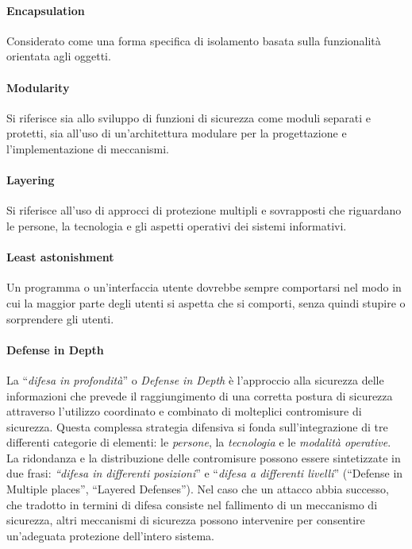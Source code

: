 \paragraph{Encapsulation}
Considerato come una forma specifica di isolamento basata sulla funzionalità
orientata agli oggetti.

\paragraph{Modularity}
Si riferisce sia allo sviluppo di funzioni di sicurezza come moduli separati e
protetti, sia all'uso di
un'architettura modulare per la progettazione e l'implementazione di meccanismi.

\paragraph{Layering}
Si riferisce all'uso di approcci di protezione multipli e sovrapposti che
riguardano le persone, la
tecnologia e gli aspetti operativi dei sistemi informativi.

\paragraph{Least astonishment}
Un programma o un'interfaccia utente dovrebbe sempre comportarsi nel modo in cui la maggior parte degli utenti si aspetta che si comporti, senza quindi stupire o sorprendere gli utenti.

\paragraph{Defense in Depth}
La ``\textit{difesa in profondità}'' o \textit{Defense in Depth} è
l'approccio alla sicurezza delle informazioni che
prevede il raggiungimento di una corretta postura di sicurezza attraverso
l'utilizzo coordinato e combinato di molteplici contromisure di sicurezza.
Questa complessa strategia difensiva si fonda sull'integrazione di tre differenti
categorie di elementi: le \textit{persone}, la \textit{tecnologia} e le
\textit{modalità operative}. La ridondanza e la distribuzione delle
contromisure possono essere sintetizzate in due
frasi: \textit{``difesa in differenti posizioni}'' e
``\textit{difesa a differenti livelli}''
(``Defense in Multiple places'', ``Layered Defenses'').
Nel caso che un attacco abbia successo, che tradotto in termini di difesa
consiste nel fallimento di un meccanismo di sicurezza, altri meccanismi di
sicurezza possono intervenire per consentire un'adeguata protezione dell'intero
sistema.

